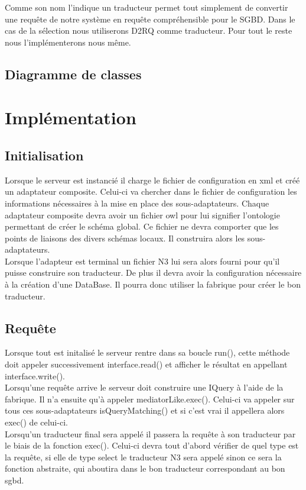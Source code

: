\documentclass[12pt]{article}
\begin{document}
	Comme son nom l'indique un traducteur permet tout simplement de convertir une requête de notre système en requête compréhensible pour le SGBD. Dans le cas de la sélection nous utiliserons D2RQ comme traducteur. Pour tout le reste nous l'implémenterons nous même.

\subsection{Diagramme de classes}

\newpage

\section{Implémentation}

\subsection{Initialisation}

	Lorsque le serveur est instancié il charge le fichier de configuration en xml et créé un adaptateur composite. Celui-ci va chercher dans le fichier de configuration les informations nécessaires à la mise en place des sous-adaptateurs. Chaque adaptateur composite devra avoir un fichier owl pour lui signifier l'ontologie permettant de créer le schéma global. Ce fichier ne devra comporter que les points de liaisons des divers schémas locaux. Il construira alors les sous-adaptateurs. \\

\indent Lorsque l'adapteur est terminal un fichier N3 lui sera alors fourni pour qu'il puisse construire son traducteur. De plus il devra avoir la configuration nécessaire à la création d'une DataBase. Il pourra donc utiliser la fabrique pour créer le bon traducteur.

\subsection{Requête}

Lorsque tout est initalisé le serveur rentre dans sa boucle run(), cette méthode doit appeler successivement interface.read() et afficher le résultat en appellant interface.write(). \\

\indent Lorsqu'une requête arrive le serveur doit construire une IQuery à l'aide de la fabrique. Il n'a ensuite qu'à appeler mediatorLike.exec(). Celui-ci va appeler sur tous ces sous-adaptateurs isQueryMatching() et si c'est vrai il appellera alors exec() de celui-ci. \\
\indent Lorsqu'un traducteur final sera appelé il passera la requête à son traducteur par le biais de la fonction exec(). Celui-ci devra tout d'abord vérifier de quel type est la requête, si elle de type select le traducteur N3 sera appelé sinon ce sera la fonction abstraite, qui aboutira dans le bon traducteur correspondant au bon sgbd. \\
\end{document}
